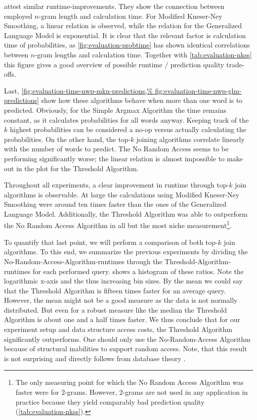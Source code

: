 attest similar runtime-improvements.
They show the connection between employed $n$-gram length and calculation time.
For Modified Kneser-Ney Smoothing, a linear relation is observed, while the
relation for the Generalized Language Model is exponential.
It is clear that the relevant factor is calculation time of probabilities, as
\cref{fig:evaluation-probtime} has shown identical correlations between $n$-gram
lengths and calculation time.
Together with \cref{tab:evaluation-nkss} this figure gives a good overview of
possible runtime / prediction quality trade-offs.

Last, \cref{fig:evaluation-time-nwp-mkn-predictions,%
fig:evaluation-time-nwp-glm-predictions} show how these algorithms behave
when more than one word is to predicted.
Obviously, for the Simple Argmax Algorithm the time remains constant, as it
calculates probabilities for all words anyway.
Keeping track of the $k$ highest probabilities can be considered a no-op versus
actually calculating the probabilities.
On the other hand, the top-$k$ joining algorithms correlate linearly with
the number of words to predict.
The No Random Access seems to be performing significantly worse; the linear
relation is almost impossible to make out in the plot for the Threshold
Algorithm.

Throughout all experiments, a clear improvement in runtime through top-$k$ join
algorithms is observable.
At large the calculations using Modified Kneser-Ney Smoothing were around ten
times faster than the ones of the Generalized Language Model.
Additionally, the Threshold Algorithm was able to outperform the No Random Access
Algorithm in all but the most niche measurement\footnote{The only measuring
point for which the No Random Access Algorithm was faster were for $2$-grams.
However, $2$-grams are not used in any application in practice because they yield
comparably bad prediction quality (\cref{tab:evaluation-nkss}).}.

To quantify that last point, we will perform a comparison of both top-$k$ join
algorithms.
To this end, we summarize the previous experiments by dividing the
No-Random-Access-Algorithm-runtimes through the Threshold-Algorithm-runtimes
for each performed query.
 shows a histogram of these ratios.
Note the logarithmic x-axis and the thus increasing bin sizes.
By the mean we could say that the Threshold Algorithm is fifteen times faster
for an average query.
However, the mean might not be a good measure as the data is not normally
distributed.
But even for a robust measure like the median the Threshold Algorithm is about
one and a half times faster.
We thus conclude that for our experiment setup and data structure access costs,
the Threshold Algorithm significantly outperforms.
One should only use the No-Random-Access Algorithm because of structural
inabilities to support random access.
Note, that this result is not surprising and directly follows from database
theory \parencite{Fagin2001}.

